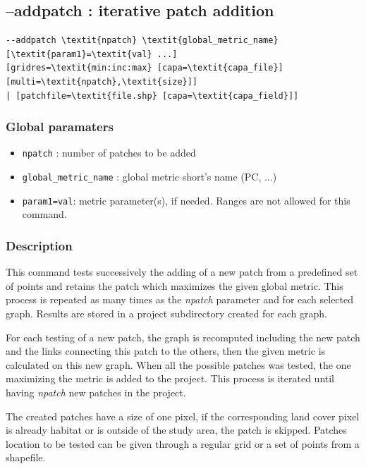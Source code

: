 \documentclass[a4paper,10pt]{report}
\begin{document}
\subsection{--addpatch : iterative patch addition}
\begin{Verbatim}[commandchars=\\\{\}]
--addpatch \textit{npatch} \textit{global_metric_name} [\textit{param1}=\textit{val} ...]
[gridres=\textit{min:inc:max} [capa=\textit{capa_file}] [multi=\textit{npatch},\textit{size}]]
| [patchfile=\textit{file.shp} [capa=\textit{capa_field}]]
\end{Verbatim}

\subsubsection{Global paramaters}
\begin{itemize}
	\item \verb|npatch| : number of patches to be added
	\item \verb|global_metric_name| : global metric short's name (PC, ...)
	\item \verb|param1=val|: metric parameter(s), if needed. Ranges are not allowed for this command.
\end{itemize}

\subsubsection{Description}
This command tests successively the adding of a new patch from a predefined set of points and retains the patch which maximizes the given global metric.
This process is repeated as many times as the \textit{npatch} parameter and for each selected graph. 
Results are stored in a project subdirectory created for each graph.

For each testing of a new patch, the graph is recomputed including the new patch and the links connecting this patch to the others, then the given metric is calculated on this new graph.
When all the possible patches was tested, the one maximizing the metric is added to the project.
This process is iterated until having \textit{npatch} new patches in the project.

The created patches have a size of one pixel, if the corresponding land cover pixel is already habitat or is outside of the study area, the patch is skipped.
Patches location to be tested can be given through a regular grid or a set of points from a shapefile.
\end{document}
